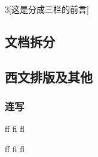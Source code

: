 \documentclass[twoside]{ctexart}
\begin{document}
{%
    \begin{multicols}{3}[\centering 这是分成三栏的前言] 
            \blindtext
            \the\columnwidth

            \columnbreak

            \blindtext
            \the\columnwidth

            \newpage

            \blindtext
            \the\columnwidth
    \end{multicols}

    \blindtext

    \clearpage 
        } 

    \subsection{文档拆分}

    \subsection{西文排版及其他}
        \subsubsection{连写}
            ff fi fl %

            f\mbox{}f f\mbox{}i f\mbox{}l %
\end{document}
